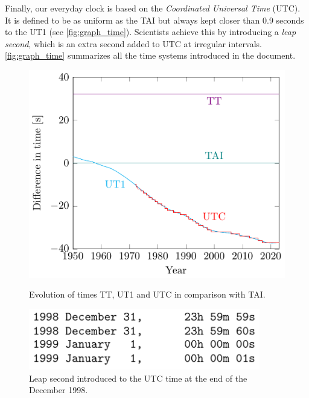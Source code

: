 \documentclass[../main.tex]{subfiles}
\begin{document}
Finally, our everyday clock is based on the \emph{Coordinated Universal Time} (UTC). It is defined to be as uniform as the TAI but always kept closer than 0.9 seconds to the UT1 (see \cref{fig:graph_time}). Scientists achieve this by introducing a \emph{leap second}, which is an extra second added to UTC at irregular intervals. \cref{fig:graph_time} summarizes all the time systems introduced in the document.

\begin{figure}[htbp]
  \centering
  \begin{minipage}[t]{0.45\textwidth}
    \centering
    \includegraphics[width=\textwidth]{Images/graph_time.pdf}
    \caption{Evolution of times TT, UT1 and UTC in comparison with TAI. \cite{iersDeltaT}}
    \label{fig:graph_time}
  \end{minipage}
  \hfill
  \begin{minipage}[ht]{0.45\textwidth}
    \centering
    \includegraphics[width=0.9\textwidth]{Images/leap_second.pdf}
    \caption{Leap second introduced to the UTC time at the end of the December 1998. \cite{iersbulletinC}}
    \label{fig:leapsecond}
  \end{minipage}
\end{figure}
\end{document}

